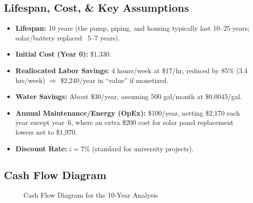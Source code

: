 \documentclass[12pt]{report}
\begin{document}
\subsection{Lifespan, Cost, \& Key Assumptions}

\begin{itemize}
    \item \textbf{Lifespan:} 10 years (the pump, piping, and housing typically last 10--25 years; solar/battery replaced ~5--7 years).
    \item \textbf{Initial Cost (Year 0):} \$1{,}330.
    \item \textbf{Reallocated Labor Savings:} 4 hours/week at \$17/hr, reduced by 85\% (3.4 hrs/week) $\Rightarrow$ \$2{,}240/year in “value” if monetized.
    \item \textbf{Water Savings:} About \$30/year, assuming 500 gal/month at \$0.0045/gal.
    \item \textbf{Annual Maintenance/Energy (OpEx):} \$100/year, netting \$2{,}170 each year except year~6, where an extra \$200 cost for solar panel replacement lowers net to \$1{,}970.
    \item \textbf{Discount Rate:} $i=7\%$ (standard for university projects).
\end{itemize}

\vspace{1em}

\subsection{Cash Flow Diagram}

\begin{figure}[h]
\centering
{}
\caption{Cash Flow Diagram for the 10-Year Analysis}
\label{fig:analysis-cashflow}
\end{figure}
\end{document}
